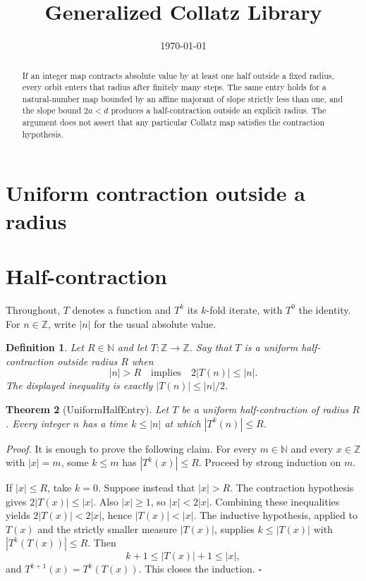 \documentclass[11pt,letterpaper]{article}
\title{Generalized Collatz Library}
\author{}
\date{\today}
\newcommand{\N}{\mathbb{N}}
\newcommand{\Z}{\mathbb{Z}}
\newcommand{\Map}[3]{#1 \colon #2 \to #3}
\newtheorem{theorem}{Theorem}
\newtheorem{definition}[theorem]{Definition}
\newenvironment{proof}{\noindent\textit{Proof.}}{\hfill\(\square\)}
\begin{document}
\maketitle
\section*{Uniform contraction outside a radius}

\begin{abstract}
If an integer map contracts absolute value by at least one half outside a fixed radius, every orbit enters that radius after finitely many steps. The same entry holds for a natural-number map bounded by an affine majorant of slope strictly less than one, and the slope bound \(2a<d\) produces a half-contraction outside an explicit radius. The argument does not assert that any particular Collatz map satisfies the contraction hypothesis.
\end{abstract}

\section{Half-contraction}

Throughout, \(T\) denotes a function and \(T^{k}\) its \(k\)-fold iterate, with \(T^{0}\) the identity. For \(n\in\Z\), write \(|n|\) for the usual absolute value.

\begin{definition}
\label{def:half-contraction}
Let \(R\in\N\) and let \(\Map{T}{\Z}{\Z}\). Say that \(T\) is a \emph{uniform half-contraction outside radius \(R\)} when
\[
|n|>R \quad\text{implies}\quad 2|T(n)|\le |n|.
\]
The displayed inequality is exactly \(|T(n)|\le |n|/2\).
\end{definition}

\begin{theorem}[UniformHalfEntry]
\label{thm:uniform-half-entry}
Let \(T\) be a uniform half-contraction of radius \(R\). Every integer \(n\) has a time \(k\le |n|\) at which \(|T^{k}(n)|\le R\).
\end{theorem}

\begin{proof}
It is enough to prove the following claim. For every \(m\in\N\) and every \(x\in\Z\) with \(|x|=m\), some \(k\le m\) has \(|T^{k}(x)|\le R\). Proceed by strong induction on \(m\).

If \(|x|\le R\), take \(k=0\). Suppose instead that \(|x|>R\). The contraction hypothesis gives \(2|T(x)|\le |x|\). Also \(|x|\ge 1\), so \(|x|<2|x|\). Combining these inequalities yields \(2|T(x)|<2|x|\), hence \(|T(x)|<|x|\). The inductive hypothesis, applied to \(T(x)\) and the strictly smaller measure \(|T(x)|\), supplies \(k\le |T(x)|\) with \(|T^{k}(T(x))|\le R\). Then
\[
k+1\le |T(x)|+1\le |x|,
\]
and \(T^{k+1}(x)=T^{k}(T(x))\). This closes the induction.
\end{proof}
\end{document}
